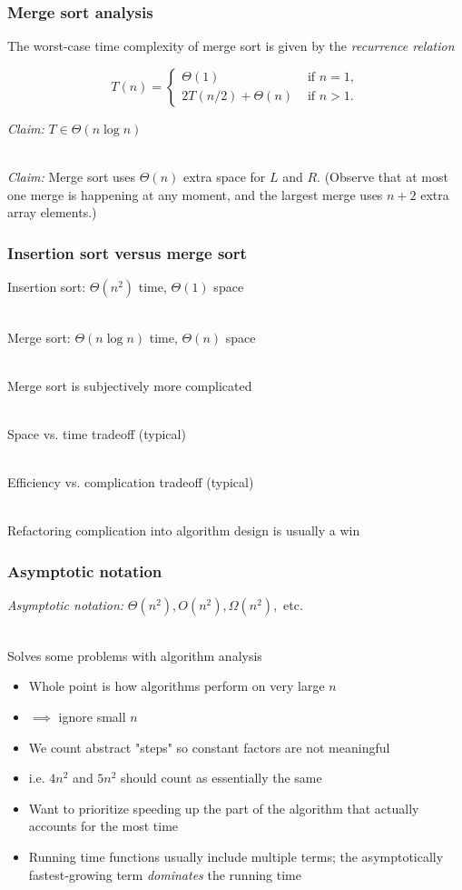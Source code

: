 \documentclass{beamer}
\newcommand{\stanza}{ \\~\ }
\begin{document}
\begin{frame} \frametitle{Merge sort analysis}
  The worst-case time complexity of merge sort is given by the
  \emph{recurrence relation}

  \begin{equation*}
    T(n) = \begin{cases}
            \Theta(1) & \text{ if } n=1, \\
            2 T(n/2) + \Theta(n) & \text{ if } n > 1 .
          \end{cases}
  \end{equation*}

  \emph{Claim:} $T \in \Theta(n \log n)$ \stanza

  \emph{Claim:} Merge sort uses $\Theta(n)$ extra space for $L$ and $R.$
  (Observe that at most one merge is happening at any moment, and the largest
   merge uses $n+2$ extra array elements.)
\end{frame}

\begin{frame} \frametitle{Insertion sort versus merge sort}
  Insertion sort: $\Theta(n^2)$ time, $\Theta(1)$ space \stanza

  Merge sort: $\Theta(n \log n)$ time, $\Theta(n)$ space \stanza

  Merge sort is subjectively more complicated \stanza

  Space vs. time tradeoff (typical) \stanza

  Efficiency vs. complication tradeoff (typical) \stanza

  Refactoring complication into algorithm design is usually a win

\end{frame}

\begin{frame} \frametitle{Asymptotic notation}
\emph{Asymptotic notation:} $\Theta(n^2), O(n^2), \Omega(n^2),$ etc. \stanza

Solves some problems with algorithm analysis
\begin{itemize}
  \item Whole point is how algorithms perform on very large $n$
  \item $\implies$ ignore small $n$
  \item We count abstract "steps" so constant factors are not meaningful
  \item i.e. $4n^2$ and $5n^2$ should count as essentially the same
  \item Want to prioritize speeding up the part of the algorithm that actually
    accounts for the most time
  \item Running time functions usually include multiple terms; the
    asymptotically fastest-growing term \emph{dominates} the running time
\end{itemize}
\end{frame}
\end{document}
